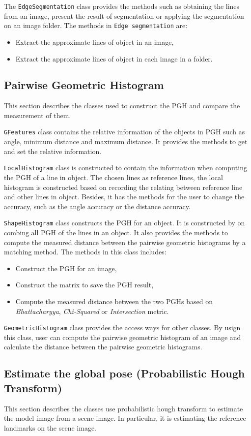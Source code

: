 The \texttt{EdgeSegmentation} class provides the methods such as obtaining the lines from an image, present the result of segmentation or applying the segmentation on an image folder. The methods in \texttt{Edge segmentation} are:
\begin{itemize}
\item Extract the approximate lines of object in an image,
\item Extract the approximate lines of object in each image in a folder.
\end{itemize}
\subsection{Pairwise Geometric Histogram}
This section describes the classes used to construct the PGH and compare the measurement of them.

\texttt{GFeatures} class contains the relative information of the objects in PGH such as angle, minimum distance and maximum distance. It provides the methods to get and set the relative information.

\texttt{LocalHistogram} class is constructed to contain the information when computing the PGH of a line in object. The chosen lines as reference lines, the local histogram is constructed based on recording the relating between reference line and other lines in object. Besides, it has the methods for the user to change the accuracy, such as the angle accuracy or the distance accuracy.

\texttt{ShapeHistogram} class constructs the PGH for an object. It is constructed by on combing all PGH of the lines in an object. It also provides the methods to compute the measured distance between the pairwise geometric histograms by a matching method. The methods in this class includes:
\begin{itemize}
\item Construct the PGH for an image,
\item Construct the matrix to save the PGH result,
\item Compute the measured distance between the two PGHs based on \textit{Bhattacharyya}, \textit{Chi-Squared} or \textit{Intersection} metric.
\end{itemize}

\texttt{GeometricHistogram} class provides the access ways for other classes. By usign this class, user can compute the pairwise geometric histogram of an image and calculate the distance between the pairwise geometric histograms.
\subsection{Estimate the global pose (Probabilistic Hough Transform)}
This section describes the classes use probabilistic hough transform to estimate the model image from a scene image. In particular, it is estimating the reference landmarks on the scene image.

